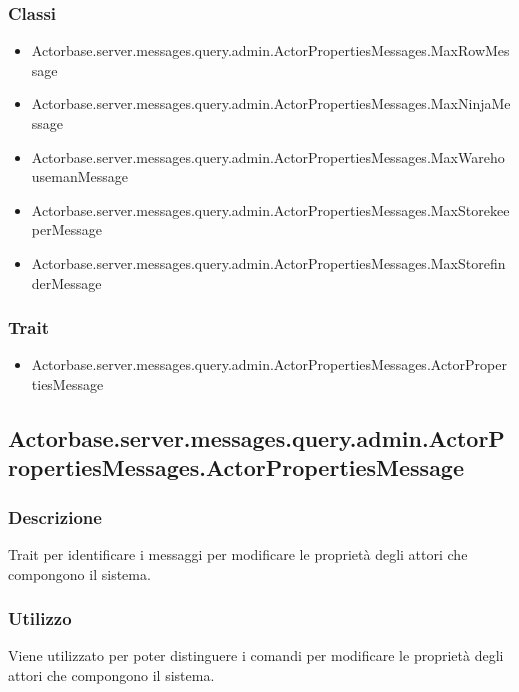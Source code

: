 \documentclass[a4paper]{article}
\begin{document}
			\subsubsection{Classi}
				\begin{itemize}
					\item Actorbase.server.messages.query.admin.ActorPropertiesMessages.MaxRowMessage
					\item Actorbase.server.messages.query.admin.ActorPropertiesMessages.MaxNinjaMessage
					\item Actorbase.server.messages.query.admin.ActorPropertiesMessages.MaxWarehousemanMessage
					\item Actorbase.server.messages.query.admin.ActorPropertiesMessages.MaxStorekeeperMessage
					\item Actorbase.server.messages.query.admin.ActorPropertiesMessages.MaxStorefinderMessage
				\end{itemize}
				
			\subsubsection{Trait}
				\begin{itemize}
					\item Actorbase.server.messages.query.admin.ActorPropertiesMessages.ActorPropertiesMessage
				\end{itemize}
		
		\subsection{Actorbase.server.messages.query.admin.ActorPropertiesMessages.ActorPropertiesMessage}
			\subsubsection{Descrizione}
				Trait per identificare i messaggi per modificare le proprietà degli attori che compongono il sistema.
				
			\subsubsection{Utilizzo}
				Viene utilizzato per poter distinguere i comandi per modificare le proprietà degli attori che compongono il sistema.
				
\end{document}
